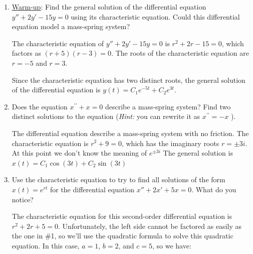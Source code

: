 \documentclass[main]{subfiles}
\begin{document}
\begin{enumerate}
 \item 
  
  \begin{problem}[\vfill]
  \uline{Warm-up}:  Find the general solution of the differential equation $y'' + 2y' - 15y = 0$ using its characteristic equation. Could this differential equation model a mass-spring system?
  \end{problem}

  \begin{solution}
  The characteristic equation of $y'' + 2y' - 15y = 0$ is $r^2 + 2r - 15
  = 0$, which factors as $(r + 5) (r - 3) = 0$.  The roots of the
  characteristic equation are $r = -5$ and $r = 3$.

  Since the characteristic equation has two distinct roots, the general
  solution of the differential equation is $y(t) = \boxed{C_1 e^{-5t} +
  C_2 e^{3t}}$.
  \end{solution}


  \item \begin{problem}[1.8in]
      Does the equation $x^{\prime \prime}+ x=0$ describe a mass-spring system? Find two distinct solutions to the equation (\textit{Hint:} you can rewrite it as $x^{\prime \prime}= -x$ ).
  \end{problem}

  \begin{solution}
    The differential equation describe a mass-spring system with no friction. The characteristic equation is $r^{2}+9=0$, which has the imaginary roots $r= \pm 3 i$. At this point we don't know the meaning of $e^{\pm 3 i}$
    The general solution is $x(t)=C_{1} \cos (3 t)+C_{2} \sin (3 t)$
  \end{solution}


 
\pspace{\newpage}
  
\item 
\begin{problem}[2.5in]
Use the characteristic equation to try to find all solutions of the form $x(t) = e^{rt}$ for the differential equation $x'' + 2x' + 5x = 0$. What do you notice?
\end{problem}
  
  \begin{solution}
  The characteristic equation for this second-order differential equation is $r^2+2r+5=0$. Unfortunately, the left side cannot be factored as easily as the one in \#1, so we'll use the quadratic formula to solve this quadratic equation. In this case, $a=1$, $b=2$, and $c=5$, so we have:
  

\end{solution}
\end{enumerate}
\end{document}
